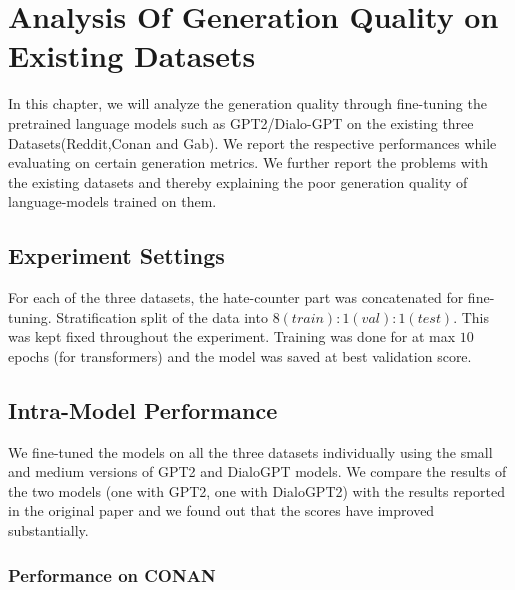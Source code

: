 \chapter{Analysis Of Generation Quality on Existing Datasets}
In this chapter, we will analyze the generation quality through fine-tuning the pretrained language models such as GPT2/Dialo-GPT on the existing three Datasets(Reddit,Conan and Gab). We report the respective performances while evaluating on certain generation metrics. We further report the problems with the existing datasets and thereby explaining the poor generation quality of language-models trained on them.

\section{Experiment Settings}
For each of the three datasets, the hate-counter part was concatenated for fine-tuning. Stratification split of the  data into $8(train):1(val):1(test)$. This was kept fixed throughout the experiment. Training was done for at max $10$ epochs (for transformers) and the model was saved at best validation score.


\section{Intra-Model Performance}
\par We fine-tuned the models on all the three datasets individually using the small and medium versions of GPT2 and DialoGPT models. 
We compare the results of the two models (one with GPT2, one with DialoGPT2) with the results reported in the original paper and we found out that the scores have improved substantially.

\subsection{Performance on CONAN}

